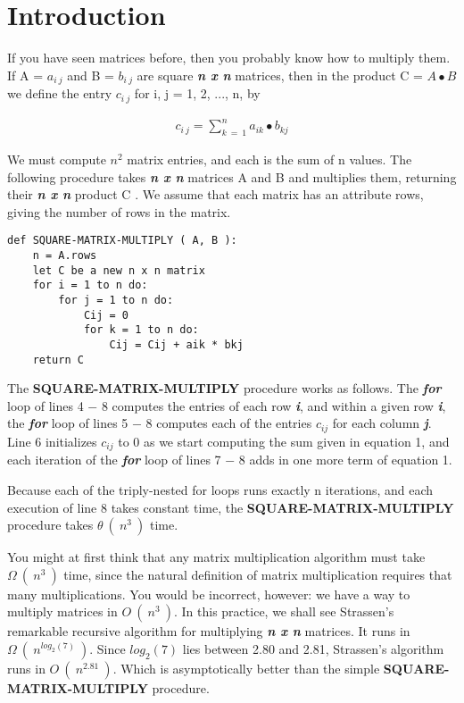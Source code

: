 \section{Introduction}

If you have seen matrices before, then you probably know how to multiply them. If A = $a_{i\ j}$ and B = $b_{i\ j}$ are square {\bfseries\itshape n x n} matrices, then in the product C = $A \bullet B$ we define the entry $c_{i\ j}$ for i, j = 1, 2, ..., n, by

\begin{ceqn}
\begin{align}
c_{i\ j} = \sum_{k\ =\ 1}^{n} a_{ik} \bullet b_{kj}
\end{align}
\end{ceqn}

We must compute $n^{2}$ matrix entries, and each is the sum of n values. The following procedure takes {\bfseries\itshape n x n} matrices A and B and multiplies them, returning their {\bfseries\itshape n x n} product C . We assume that each matrix has an attribute rows, giving the number of rows in the matrix. \hfill \break

\begin{lstlisting}
def SQUARE-MATRIX-MULTIPLY ( A, B ):
	n = A.rows
	let C be a new n x n matrix
	for i = 1 to n do:
		for j = 1 to n do:
			Cij = 0
			for k = 1 to n do:
				Cij = Cij + aik * bkj
	return C
\end{lstlisting} \hfill

The {\bfseries SQUARE-MATRIX-MULTIPLY} procedure works as follows. The {\bfseries\itshape for} loop of lines 4 $-$ 8 computes the entries of each row {\bfseries\itshape i}, and within a given row {\bfseries\itshape i}, the {\bfseries\itshape for} loop of lines 5 $-$ 8 computes each of the entries $c_{ij}$  for each column {\bfseries\itshape j}. Line 6 initializes $c_{ij}$ to 0 as we start computing the sum given in equation 1, and each iteration of the {\bfseries\itshape for} loop of lines 7 $-$ 8 adds in one more term of equation 1. \hfill \break

Because each of the triply-nested for loops runs exactly n iterations, and each execution of line 8 takes constant time, the {\bfseries SQUARE-MATRIX-MULTIPLY} procedure takes $\theta\ (\ n^{3}\ )$ time. \hfill \break

You might at first think that any matrix multiplication algorithm must take $\Omega\ (\ n^{3}\ )$ time, since the natural definition of matrix multiplication requires that many multiplications. You would be incorrect, however: we have a way to multiply matrices in $O\ (\ n^{3}\ )$. In this practice, we shall see Strassen’s remarkable recursive algorithm for multiplying {\bfseries\itshape n x n} matrices. It runs in $\Omega\ (\ n^{log_{2}(7)}\ )$. Since $log_{2}(7)$ lies between 2.80 and 2.81, Strassen’s algorithm runs in $O\ (\ n^{2.81}\ )$. Which is asymptotically better than the simple {\bfseries SQUARE-MATRIX-MULTIPLY} procedure.

\pagebreak